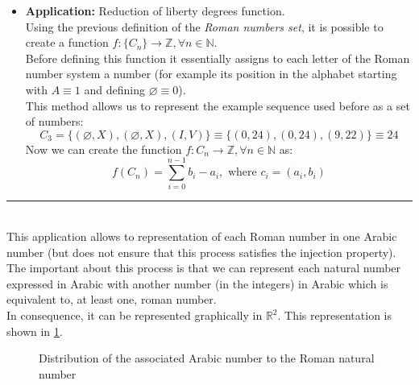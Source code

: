 \documentclass[a4paper, 11pt]{article}
\begin{document}
    \begin{itemize}
        \item \textbf{Application:} Reduction of liberty degrees function.\\
 Using the previous definition of the \textit{Roman numbers set}, it is possible to create a function $f:\{C_n\}\rightarrow \mathbb{Z}, \forall n \in \mathbb{N}$.\\
 Before defining this function it essentially assigns to each letter of the Roman number system a number (for example its position in the alphabet starting with $A\equiv1$ and defining $\varnothing \equiv 0$).\\
 This method allows us to represent the example sequence used before as a set of numbers: 
        $$C_3 = \{ (\varnothing, X), (\varnothing, X), (I,V) \} \equiv \{ (0,24), (0,24), (9,22) \} \equiv 24$$
 Now we can create the function $f:C_n\rightarrow \mathbb{Z}, \forall n \in \mathbb{N}$ as:
        $$ f(C_n) = \sum_{i = 0}^{n-1} b_i-a_i, \text{ where } c_i = (a_i, b_i) $$
    \end{itemize}
\rule{\linewidth}{0.4pt}\\
This application allows to representation of each Roman number in one Arabic number (but does not ensure that this process satisfies the injection property).\\
The important about this process is that we can represent each natural number expressed in Arabic with another number (in the integers) in Arabic which is equivalent to, at least one, roman number.\\
In consequence, it can be represented graphically in $\mathbb{R}^2$. This representation is shown in \ref{romans}.
\begin{figure}[h]
    \centering
    \caption{Distribution of the associated Arabic number to the Roman natural number}
    \label{romans}
\end{figure}\\
\end{document}
